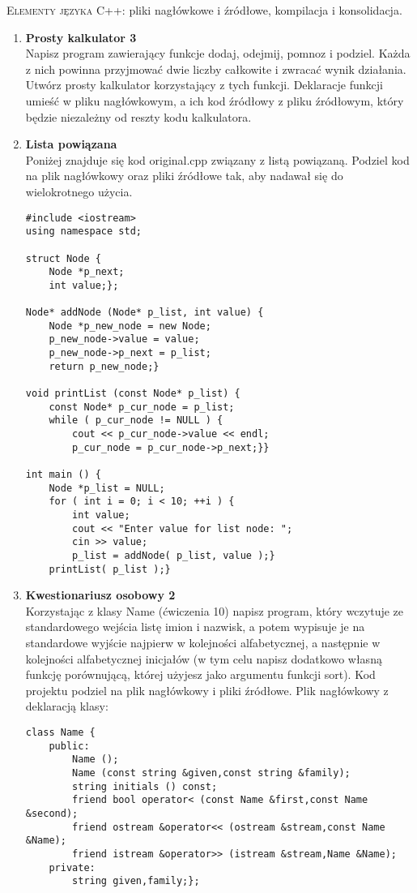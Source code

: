 \documentclass[12pt]{article}
\begin{document}
\small \textsc{Elementy języka C++:} pliki nagłówkowe i źródłowe, kompilacja i konsolidacja.

\begin{enumerate}

\item \textbf{Prosty kalkulator 3}\\
Napisz program zawierający funkcje \textsf{dodaj}, \textsf{odejmij}, \textsf{pomnoz} i \textsf{podziel}. Każda z nich powinna przyjmować dwie liczby całkowite i zwracać wynik działania. Utwórz prosty kalkulator korzystający z tych funkcji. Deklaracje funkcji umieść w pliku nagłówkowym, a ich kod źródłowy z pliku źródłowym, który będzie niezależny od reszty kodu kalkulatora.

\item \textbf{Lista powiązana}\\
Poniżej znajduje się kod \textsf{original.cpp} związany z listą powiązaną. Podziel kod na plik nagłówkowy oraz pliki źródłowe tak, aby nadawał się do wielokrotnego użycia.
\begin{verbatim}
#include <iostream>
using namespace std;

struct Node {
	Node *p_next;
	int value;};

Node* addNode (Node* p_list, int value) {
	Node *p_new_node = new Node;
	p_new_node->value = value;
	p_new_node->p_next = p_list;
	return p_new_node;}

void printList (const Node* p_list) {
	const Node* p_cur_node = p_list;
	while ( p_cur_node != NULL ) {
		cout << p_cur_node->value << endl;
		p_cur_node = p_cur_node->p_next;}}

int main () {
	Node *p_list = NULL;
	for ( int i = 0; i < 10; ++i ) {
		int value;
		cout << "Enter value for list node: ";
		cin >> value;
		p_list = addNode( p_list, value );}
	printList( p_list );}
\end{verbatim}

\newpage

\item \textbf{Kwestionariusz osobowy 2}\\
Korzystając z klasy \textsf{Name} (ćwiczenia 10) napisz program, który wczytuje ze standardowego wejścia listę imion i nazwisk, a potem wypisuje je na standardowe wyjście najpierw w kolejności alfabetycznej, a następnie w kolejności alfabetycznej inicjałów (w tym celu napisz dodatkowo własną funkcję porównującą, której użyjesz jako argumentu funkcji \textsf{sort}). Kod projektu podziel na plik nagłówkowy i pliki źródłowe. Plik nagłówkowy z deklaracją klasy:
\begin{verbatim}
class Name {
	public:
		Name ();
		Name (const string &given,const string &family);
		string initials () const;
		friend bool operator< (const Name &first,const Name &second);
		friend ostream &operator<< (ostream &stream,const Name &Name);
		friend istream &operator>> (istream &stream,Name &Name);
	private:
		string given,family;};
\end{verbatim}


\end{enumerate}
\end{document}

